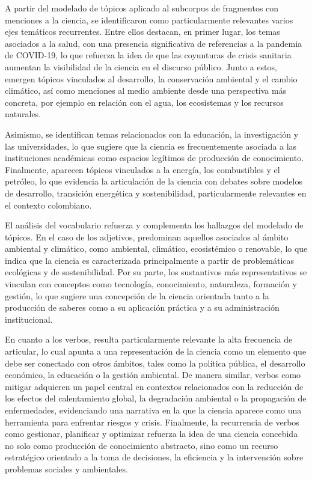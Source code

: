 \documentclass[11pt,a4paper]{article}
\begin{document}
A partir del modelado de tópicos aplicado al subcorpus de fragmentos con menciones a la ciencia, se identificaron como particularmente relevantes varios ejes temáticos recurrentes. Entre ellos destacan, en primer lugar, los temas asociados a la salud, con una presencia significativa de referencias a la pandemia de COVID-19, lo que refuerza la idea de que las coyunturas de crisis sanitaria aumentan la visibilidad de la ciencia en el discurso público. Junto a estos, emergen tópicos vinculados al desarrollo, la conservación ambiental y el cambio climático, así como menciones al medio ambiente desde una perspectiva más concreta, por ejemplo en relación con el agua, los ecosistemas y los recursos naturales.

Asimismo, se identifican temas relacionados con la educación, la investigación y las universidades, lo que sugiere que la ciencia es frecuentemente asociada a las instituciones académicas como espacios legítimos de producción de conocimiento. Finalmente, aparecen tópicos vinculados a la energía, los combustibles y el petróleo, lo que evidencia la articulación de la ciencia con debates sobre modelos de desarrollo, transición energética y sostenibilidad, particularmente relevantes en el contexto colombiano.

El análisis del vocabulario refuerza y complementa los hallazgos del modelado de tópicos. En el caso de los adjetivos, predominan aquellos asociados al ámbito ambiental y climático, como ambiental, climático, ecosistémico o renovable, lo que indica que la ciencia es caracterizada principalmente a partir de problemáticas ecológicas y de sostenibilidad. Por su parte, los sustantivos más representativos se vinculan con conceptos como tecnología, conocimiento, naturaleza, formación y gestión, lo que sugiere una concepción de la ciencia orientada tanto a la producción de saberes como a su aplicación práctica y a su administración institucional.

En cuanto a los verbos, resulta particularmente relevante la alta frecuencia de articular, lo cual apunta a una representación de la ciencia como un elemento que debe ser conectado con otros ámbitos, tales como la política pública, el desarrollo económico, la educación o la gestión ambiental. De manera similar, verbos como mitigar adquieren un papel central en contextos relacionados con la reducción de los efectos del calentamiento global, la degradación ambiental o la propagación de enfermedades, evidenciando una narrativa en la que la ciencia aparece como una herramienta para enfrentar riesgos y crisis. Finalmente, la recurrencia de verbos como gestionar, planificar y optimizar refuerza la idea de una ciencia concebida no solo como producción de conocimiento abstracto, sino como un recurso estratégico orientado a la toma de decisiones, la eficiencia y la intervención sobre problemas sociales y ambientales.
\end{document}
